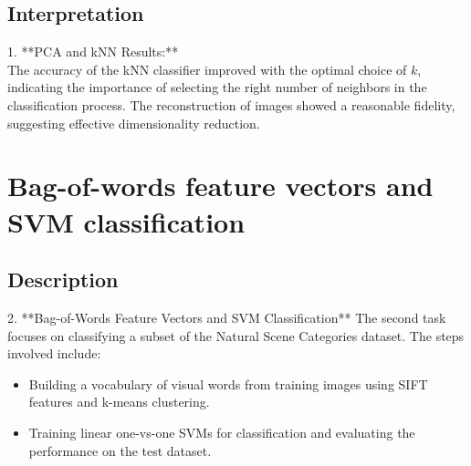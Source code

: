 \documentclass{article}
\begin{document}
\subsection{Interpretation}
1. **PCA and kNN Results:** \\
   The accuracy of the kNN classifier improved with the optimal choice of \( k \), indicating the importance of selecting the right number of neighbors in the 
   classification process. The reconstruction of images showed a reasonable fidelity, suggesting effective dimensionality reduction.


\section{Bag-of-words feature vectors and SVM classification}   
\subsection{Description}
2. **Bag-of-Words Feature Vectors and SVM Classification**  
   The second task focuses on classifying a subset of the Natural Scene Categories dataset. The steps involved include:
   \begin{itemize}
       \item Building a vocabulary of visual words from training images using SIFT features and k-means clustering.
       \item Training linear one-vs-one SVMs for classification and evaluating the performance on the test dataset.
   \end{itemize}
\end{document}
